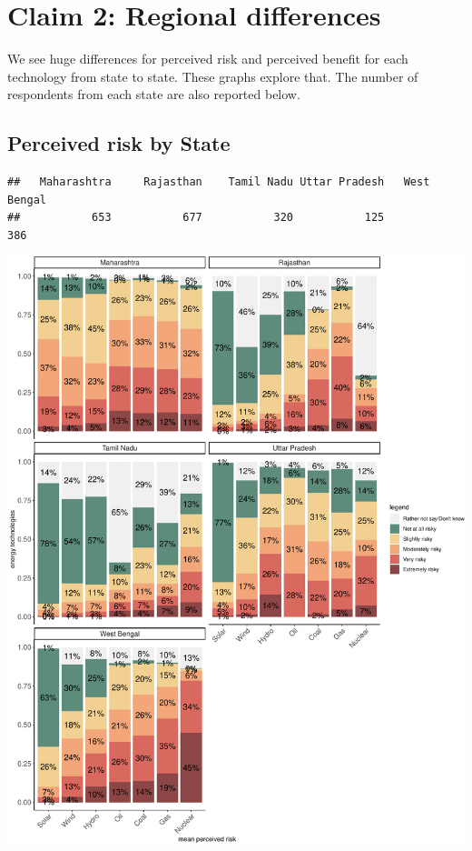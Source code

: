 \documentclass[
]{article}
\begin{document}
\newpage

\hypertarget{claim-2-regional-differences}{%
\section{Claim 2: Regional
differences}\label{claim-2-regional-differences}}

We see huge differences for perceived risk and perceived benefit for
each technology from state to state. These graphs explore that. The
number of respondents from each state are also reported below.

\hypertarget{perceived-risk-by-state}{%
\subsection{Perceived risk by State}\label{perceived-risk-by-state}}

\begin{verbatim}
##   Maharashtra     Rajasthan    Tamil Nadu Uttar Pradesh   West Bengal 
##           653           677           320           125           386
\end{verbatim}

\includegraphics[width=0.8\linewidth,height=0.8\textheight]{nuclear-in-comparison_files/figure-latex/unnamed-chunk-15-1}
\end{document}
